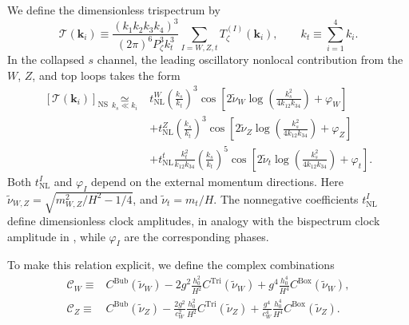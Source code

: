 \documentclass[a4paper,12pt]{article}
\def\mb{\mathbf}
\begin{document}
We define the dimensionless trispectrum by
\begin{equation}
    \mathcal T(\mb k_i)
    \equiv\frac{(k_1k_2k_3k_4)^3}{(2\pi)^6P_\zeta^3k_t^3}
    \sum_{I=W,Z,t} T_\zeta^{(I)}(\mb k_i),
    \qquad k_t\equiv\sum_{i=1}^4k_i.
    \label{eq:phenomenology-dimensionless-trispectrum}
\end{equation}
In the collapsed $s$ channel, the leading oscillatory nonlocal contribution from the $W$, $Z$, and top loops takes the form
\begin{align}
    \left[\mathcal T(\mb k_i)\right]_{\mathrm{NS}}
    \underset{k_s\ll k_i}{\simeq}{}&
    t_{\mathrm{NL}}^W\left(\frac{k_s}{k_t}\right)^3
    \cos\!\left[2\tilde\nu_W\log\!\left(\frac{k_s^2}{4k_{12}k_{34}}\right)
    +\varphi_W\right]\nonumber\\
    &+t_{\mathrm{NL}}^Z\left(\frac{k_s}{k_t}\right)^3
    \cos\!\left[2\tilde\nu_Z\log\!\left(\frac{k_s^2}{4k_{12}k_{34}}\right)
    +\varphi_Z\right]\nonumber\\
    &+t_{\mathrm{NL}}^t\frac{k_t^2}{k_{12}k_{34}}
    \left(\frac{k_s}{k_t}\right)^5
    \cos\!\left[2\tilde\nu_t\log\!\left(\frac{k_s^2}{4k_{12}k_{34}}\right)
    +\varphi_t\right].
    \label{eq:phenomenology-clock-shape}
\end{align}
Both $t_{\mathrm{NL}}^I$ and $\varphi_I$ depend on the external momentum directions.
Here $\tilde\nu_{W,Z}=\sqrt{m_{W,Z}^2/H^2-1/4}$, and $\tilde\nu_t=m_t/H$.
The nonnegative coefficients $t_{\mathrm{NL}}^I$ define dimensionless clock amplitudes, in analogy with the bispectrum clock amplitude in \cite{lu_cosmological_2020}, while $\varphi_I$ are the corresponding phases.

To make this relation explicit, we define the complex combinations
\begin{equation}
    \begin{aligned}
        \mathcal C_W\equiv{}&C^{\mathrm{Bub}}(\tilde\nu_W)
        -2g^2\frac{h_0^2}{H^2}C^{\mathrm{Tri}}(\tilde\nu_W)
        +g^4\frac{h_0^4}{H^4}C^{\mathrm{Box}}(\tilde\nu_W),\\
        \mathcal C_Z\equiv{}&C^{\mathrm{Bub}}(\tilde\nu_Z)
        -\frac{2g^2}{c_W^2}\frac{h_0^2}{H^2}C^{\mathrm{Tri}}(\tilde\nu_Z)
        +\frac{g^4}{c_W^4}\frac{h_0^4}{H^4}C^{\mathrm{Box}}(\tilde\nu_Z).
    \end{aligned}
    \label{eq:phenomenology-gauge-clock-combinations}
\end{equation}
\end{document}
